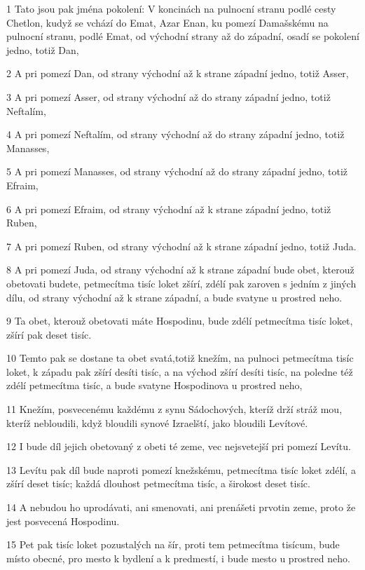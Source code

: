 \par 1 Tato jsou pak jména pokolení: V koncinách na pulnocní stranu podlé cesty Chetlon, kudyž se vchází do Emat, Azar Enan, ku pomezí Damašskému na pulnocní stranu, podlé Emat, od východní strany až do západní, osadí se pokolení jedno, totiž Dan,
\par 2 A pri pomezí Dan, od strany východní až k strane západní jedno, totiž Asser,
\par 3 A pri pomezí Asser, od strany východní až do strany západní jedno, totiž Neftalím,
\par 4 A pri pomezí Neftalím, od strany východní až do strany západní jedno, totiž Manasses,
\par 5 A pri pomezí Manasses, od strany východní až do strany západní jedno, totiž Efraim,
\par 6 A pri pomezí Efraim, od strany východní až k strane západní jedno, totiž Ruben,
\par 7 A pri pomezí Ruben, od strany východní až k strane západní jedno, totiž Juda.
\par 8 A pri pomezí Juda, od strany východní až k strane západní bude obet, kterouž obetovati budete, petmecítma tisíc loket zšírí, zdélí pak zaroven s jedním z jiných dílu, od strany východní až k strane západní, a bude svatyne u prostred neho.
\par 9 Ta obet, kterouž obetovati máte Hospodinu, bude zdélí petmecítma tisíc loket, zšírí pak deset tisíc.
\par 10 Temto pak se dostane ta obet svatá,totiž knežím, na pulnoci petmecítma tisíc loket, k západu pak zšírí desíti tisíc, a na východ zšírí desíti tisíc, na poledne též zdélí petmecítma tisíc, a bude svatyne Hospodinova u prostred neho,
\par 11 Knežím, posvecenému každému z synu Sádochových, kteríž drží stráž mou, kteríž nebloudili, když bloudili synové Izraelští, jako bloudili Levítové.
\par 12 I bude díl jejich obetovaný z obeti té zeme, vec nejsvetejší pri pomezí Levítu.
\par 13 Levítu pak díl bude naproti pomezí knežskému, petmecítma tisíc loket zdélí, a zšírí deset tisíc; každá dlouhost petmecítma tisíc, a širokost deset tisíc.
\par 14 A nebudou ho uprodávati, ani smenovati, ani prenášeti prvotin zeme, proto že jest posvecená Hospodinu.
\par 15 Pet pak tisíc loket pozustalých na šír, proti tem petmecítma tisícum, bude místo obecné, pro mesto k bydlení a k predmestí, i bude mesto u prostred neho.
